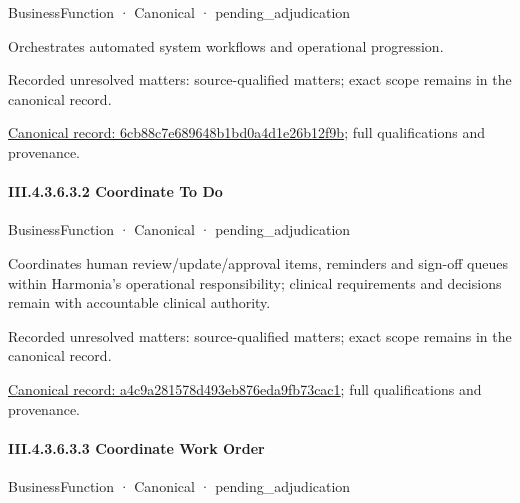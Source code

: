 \label{element:6cb88c7e689648b1bd0a4d1e26b12f9b}
{\small BusinessFunction · Canonical · pending\_adjudication}\par

Orchestrates automated system workflows and operational progression.


{\small Recorded unresolved matters: source-qualified matters; exact scope remains in the canonical record.}\par
{\footnotesize \href{../../../../../../../continuum/business/business-function/6cb88c7e689648b1bd0a4d1e26b12f9b.md}{Canonical record: 6cb88c7e689648b1bd0a4d1e26b12f9b}; full qualifications and provenance.}\par
\paragraph*{III.4.3.6.3.2 Coordinate To Do}
\label{navigation:III.4.3.6.3.2}

\label{element:a4c9a281578d493eb876eda9fb73cac1}
{\small BusinessFunction · Canonical · pending\_adjudication}\par

Coordinates human review/update/approval items, reminders and sign-off queues within Harmonia's operational responsibility; clinical requirements and decisions remain with accountable clinical authority.


{\small Recorded unresolved matters: source-qualified matters; exact scope remains in the canonical record.}\par
{\footnotesize \href{../../../../../../../continuum/business/business-function/a4c9a281578d493eb876eda9fb73cac1.md}{Canonical record: a4c9a281578d493eb876eda9fb73cac1}; full qualifications and provenance.}\par
\paragraph*{III.4.3.6.3.3 Coordinate Work Order}
\label{navigation:III.4.3.6.3.3}

\label{element:0161308bad6945b5bcfdeea5519341cd}
{\small BusinessFunction · Canonical · pending\_adjudication}\par

